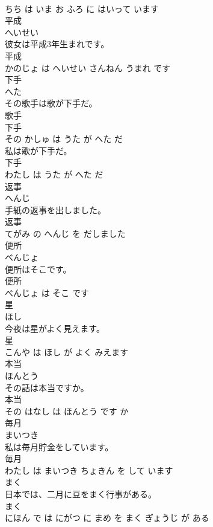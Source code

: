 \documentclass[8pt]{extreport}
\begin{document}
\begin{CJK}{UTF8}{min}
\\	ちち は いま お ふろ に はいって います			
\\	平成	
\\	へいせい			
\\	彼女は平成3年生まれです。	
\\	平成 
\\	かのじょ は へいせい さんねん うまれ です			
\\	下手	
\\	へた			
\\	その歌手は歌が下手だ。	
\\	歌手 
\\	下手 
\\	その かしゅ は うた が へた だ			
\\	私は歌が下手だ。	
\\	下手 
\\	わたし は うた が へた だ			
\\	返事	
\\	へんじ			
\\	手紙の返事を出しました。	
\\	返事 
\\	てがみ の へんじ を だしました			
\\	便所	
\\	べんじょ			
\\	便所はそこです。	
\\	便所 
\\	べんじょ は そこ です			
\\	星	
\\	ほし			
\\	今夜は星がよく見えます。	
\\	星 
\\	こんや は ほし が よく みえます			
\\	本当	
\\	ほんとう			
\\	その話は本当ですか。	
\\	本当 
\\	その はなし は ほんとう です か			
\\	毎月	
\\	まいつき			
\\	私は毎月貯金をしています。	
\\	毎月 
\\	わたし は まいつき ちょきん を して います			
\\	まく	
\\	日本では、二月に豆をまく行事がある。	
\\	まく 
\\	にほん で は にがつ に まめ を まく ぎょうじ が ある			

\end{CJK}
\end{document}
